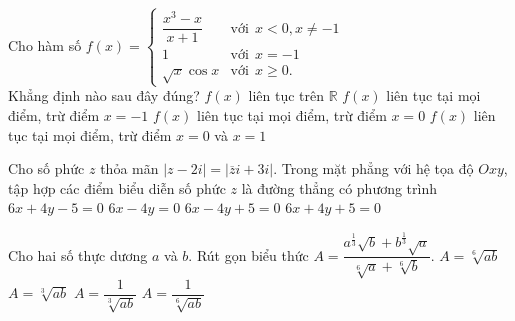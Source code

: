 \begin{ex}%
	
	Cho hàm số $f(x)=\begin{cases}
	\dfrac{x^3-x}{x+1}& \text{với} \ \ x<0, x\ne -1 \\
	1& \text{với}\ \ x=-1\\
	\sqrt{x}\cos x &\text{với} \ \ x\ge 0.
	\end{cases}$\\
	Khẳng định nào sau đây đúng?
	\choice
	{$f(x)$ liên tục trên $\mathbb{R}$}
	{\True $f(x)$ liên tục tại mọi điểm, trừ điểm $x=-1$}
	{$f(x)$ liên tục tại mọi điểm, trừ điểm $x=0$}
	{$f(x)$ liên tục tại mọi điểm, trừ điểm $x=0$ và $x=1$}
\end{ex}
\begin{ex}%
	Cho số phức $z$ thỏa mãn $|z-2i|=|\overline{z}i+3i|$. Trong mặt phẳng với hệ tọa độ $Oxy$, tập hợp các điểm  biểu diễn số phức $z$ là đường thẳng có phương trình
	\choice
	{$6x+4y-5=0$}	{$6x-4y=0$}	{$6x-4y+5=0$}	{\True $6x+4y+5=0$}
	
\end{ex}
\begin{ex}%
	Cho hai số thực dương $a$ và $b$. Rút gọn biểu thức $A=\dfrac{a^{\frac{1}{3}}\sqrt{b}+b^{\frac{1}{3}}\sqrt{a}}{\sqrt[6]{a}+\sqrt[6]{b}}$.
	\choice
	{$A=\sqrt[6]{ab}$}
	{\True$A=\sqrt[3]{ab}$}
	{$A=\dfrac{1}{\sqrt[3]{ab}}$}
	{$A=\dfrac{1}{\sqrt[6]{ab}}$}
\end{ex}
